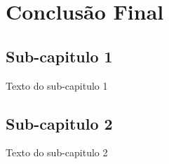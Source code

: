 \chapter{Conclusão Final}
\section{Sub-capitulo 1}
Texto do sub-capitulo 1
\section{Sub-capitulo 2}
Texto do sub-capitulo 2

